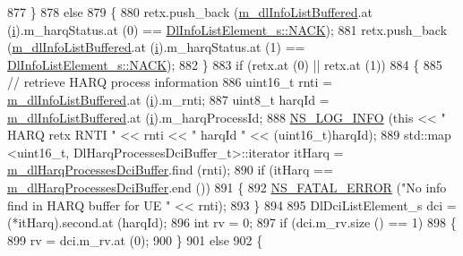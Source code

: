 \begin{DoxyCode}
877         \}
878       \textcolor{keywordflow}{else}
879         \{
880           retx.push\_back (\hyperlink{classns3_1_1PssFfMacScheduler_a3a7d9c7460c66767201d15a1d6f58758}{m\_dlInfoListBuffered}.at (\hyperlink{bernuolliDistribution_8m_a6f6ccfcf58b31cb6412107d9d5281426}{i}).m\_harqStatus.at (0) == 
      \hyperlink{structns3_1_1DlInfoListElement__s_a3e55b89f756b7bd8909c8116a202a17aaf90e76e67c86729b4ee21927b7fb1770}{DlInfoListElement\_s::NACK});
881           retx.push\_back (\hyperlink{classns3_1_1PssFfMacScheduler_a3a7d9c7460c66767201d15a1d6f58758}{m\_dlInfoListBuffered}.at (\hyperlink{bernuolliDistribution_8m_a6f6ccfcf58b31cb6412107d9d5281426}{i}).m\_harqStatus.at (1) == 
      \hyperlink{structns3_1_1DlInfoListElement__s_a3e55b89f756b7bd8909c8116a202a17aaf90e76e67c86729b4ee21927b7fb1770}{DlInfoListElement\_s::NACK});
882         \}
883       \textcolor{keywordflow}{if} (retx.at (0) || retx.at (1))
884         \{
885           \textcolor{comment}{// retrieve HARQ process information}
886           uint16\_t rnti = \hyperlink{classns3_1_1PssFfMacScheduler_a3a7d9c7460c66767201d15a1d6f58758}{m\_dlInfoListBuffered}.at (\hyperlink{bernuolliDistribution_8m_a6f6ccfcf58b31cb6412107d9d5281426}{i}).m\_rnti;
887           uint8\_t harqId = \hyperlink{classns3_1_1PssFfMacScheduler_a3a7d9c7460c66767201d15a1d6f58758}{m\_dlInfoListBuffered}.at (\hyperlink{bernuolliDistribution_8m_a6f6ccfcf58b31cb6412107d9d5281426}{i}).m\_harqProcessId;
888           \hyperlink{group__logging_gafbd73ee2cf9f26b319f49086d8e860fb}{NS\_LOG\_INFO} (\textcolor{keyword}{this} << \textcolor{stringliteral}{" HARQ retx RNTI "} << rnti << \textcolor{stringliteral}{" harqId "} << (uint16\_t)harqId);
889           std::map <uint16\_t, DlHarqProcessesDciBuffer\_t>::iterator itHarq = 
      \hyperlink{classns3_1_1PssFfMacScheduler_a167441dd2a0e5cde664eedfd19a07fbf}{m\_dlHarqProcessesDciBuffer}.find (rnti);
890           \textcolor{keywordflow}{if} (itHarq == \hyperlink{classns3_1_1PssFfMacScheduler_a167441dd2a0e5cde664eedfd19a07fbf}{m\_dlHarqProcessesDciBuffer}.end ())
891             \{
892               \hyperlink{group__fatal_ga5131d5e3f75d7d4cbfd706ac456fdc85}{NS\_FATAL\_ERROR} (\textcolor{stringliteral}{"No info find in HARQ buffer for UE "} << rnti);
893             \}
894 
895           DlDciListElement\_s dci = (*itHarq).second.at (harqId);
896           \textcolor{keywordtype}{int} rv = 0;
897           \textcolor{keywordflow}{if} (dci.m\_rv.size () == 1)
898             \{
899               rv = dci.m\_rv.at (0);
900             \}
901           \textcolor{keywordflow}{else}
902             \{

\end{DoxyCode}
